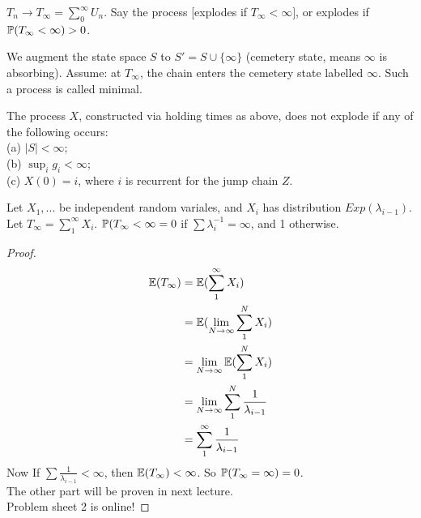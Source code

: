 \documentclass[a4paper]{article}
\begin{document}
$T_n \to T_\infty = \sum_0^\infty U_n$. Say the process [explodes if $T_\infty < \infty]$, or explodes if $\P(T_\infty < \infty) > 0$.

We augment the state space $S$ to $S' = S \cup \{\infty\}$ (cemetery state, means $\infty$ is absorbing). Assume: at $T_\infty$, the chain enters the cemetery state labelled $\infty$. Such a process is called minimal.

\begin{thm}
The process $X$, constructed via holding times as above, does not explode if any of the following occurs:\\
(a) $|S| < \infty$;\\
(b) $\sup_i g_i < \infty$;\\
(c) $X(0) = i$, where $i$ is recurrent for the jump chain $Z$.
\end{thm}

\begin{lemma}
Let $X_1,...$ be independent random variales, and $X_i$ has distribution $Exp(\lambda_{i-1})$. Let $T_\infty = \sum_1^\infty X_i$. $\P(T_\infty < \infty = 0$ if $\sum \lambda_i^{-1} = \infty$, and 1 otherwise.
\begin{proof}
\begin{equation*}
\begin{aligned}
\E(T_\infty) &= \E(\sum_1^\infty X_i)\\
&= \E (\lim_{N \to \infty} \sum_1^N X_i)\\
&= \lim_{N \to \infty} \E(\sum_1^N X_i)\\
&= \lim_{N \to \infty} \sum_1^N \frac{1}{\lambda_{i-1}}\\
&= \sum_1^\infty \frac{1}{\lambda_{i-1}}
\end{aligned}
\end{equation*}
Now If $\sum \frac{1}{\lambda_{i-1}} < \infty$, then $\E(T_\infty) < \infty$. So $\P(T_\infty = \infty) = 0$.\\
The other part will be proven in next lecture.\\
Problem sheet 2 is online!
\end{proof}
\end{lemma}

\end{document}
